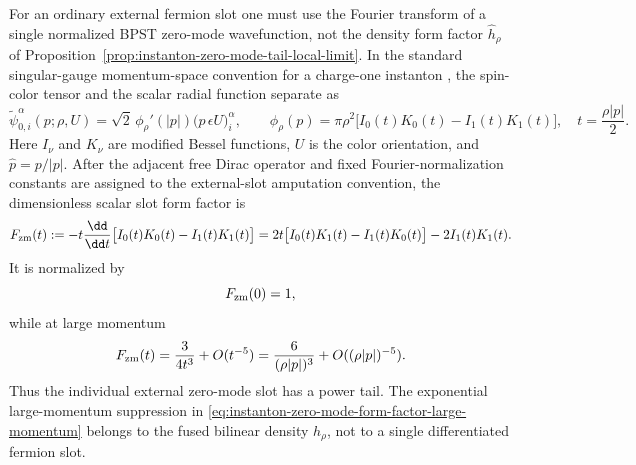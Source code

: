 \begin{proposition}
\label{prop:instanton-individual-zero-mode-form-factor}
For an ordinary external fermion slot one must use the Fourier transform of a
single normalized BPST zero-mode wavefunction, not the density form factor
\(\widehat h_\rho\) of
Proposition~\ref{prop:instanton-zero-mode-tail-local-limit}.  In the standard
singular-gauge momentum-space convention for a charge-one instanton
\cite{tHooft1976Pseudoparticle,DiakonovPetrov1986InstantonVacuum}, the
spin-color tensor and the scalar radial function separate as
\begin{equation}
  \widetilde\psi_{0,i}^{\alpha}(p;\rho,U)
  =
  \sqrt2\,\phi_\rho'(|p|)
  \bigl(\widehat p\,\epsilon U\bigr)_{i}^{\alpha},
  \qquad
  \phi_\rho(p)
  =
  \pi\rho^2
  \bigl[I_0(t)K_0(t)-I_1(t)K_1(t)\bigr],
  \quad
  t=\frac{\rho |p|}{2}.
  \label{eq:instanton-momentum-zero-mode-wavefunction}
\end{equation}
Here \(I_\nu\) and \(K_\nu\) are modified Bessel functions, \(U\) is the color
orientation, and \(\widehat p=p/|p|\).  After the adjacent free Dirac operator
and fixed Fourier-normalization constants are assigned to the external-slot
amputation convention, the dimensionless scalar slot form factor is
\begin{equation}
  F_{\rm zm}(t)
  :=
  -t\frac{\dd}{\dd t}
  \bigl[I_0(t)K_0(t)-I_1(t)K_1(t)\bigr]
  =
  2t\bigl[I_0(t)K_1(t)-I_1(t)K_0(t)\bigr]
  -2I_1(t)K_1(t).
  \label{eq:instanton-individual-zero-mode-form-factor}
\end{equation}
It is normalized by
\begin{equation}
  F_{\rm zm}(0)=1,
  \label{eq:instanton-individual-zero-mode-form-factor-local}
\end{equation}
while at large momentum
\begin{equation}
  F_{\rm zm}(t)
  =
  \frac{3}{4t^3}+O(t^{-5})
  =
  \frac{6}{(\rho |p|)^3}+O((\rho |p|)^{-5}).
  \label{eq:instanton-individual-zero-mode-form-factor-large}
\end{equation}
Thus the individual external zero-mode slot has a power tail.  The exponential
large-momentum suppression in
\eqref{eq:instanton-zero-mode-form-factor-large-momentum} belongs to the fused
bilinear density \(h_\rho\), not to a single differentiated fermion slot.
\end{proposition}

